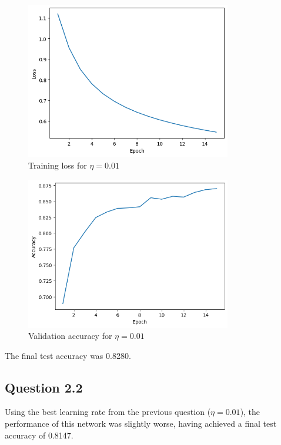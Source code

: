 \documentclass{article}
\begin{document}
\begin{figure}[H]
    \centering
    \includegraphics[width=0.8\textwidth]{plots/CNN-training-loss-0.01-0.7-0-sgd-False.png}
    \caption{Training loss for $\eta=0.01$}
    \label{fig:2.1-training_loss}
\end{figure}

\begin{figure}[H]
    \centering
    \includegraphics[width=0.8\textwidth]{plots/CNN-validation-accuracy-0.01-0.7-0-sgd-False.png}
    \caption{Validation accuracy for $\eta=0.01$}
    \label{fig:2.1-validation_accuracy}
\end{figure}

The final test accuracy was 0.8280.

\subsection{Question 2.2}
Using the best learning rate from the previous question ($\eta=0.01$), the performance of this network was slightly worse,
having achieved a final test accuracy of 0.8147.
\end{document}
